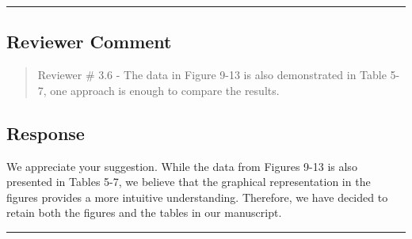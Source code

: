 \noindent\rule{\linewidth}{2.0pt}

\subsection{Reviewer Comment}
\begin{mdframed}
	\begin{quote}
		Reviewer \# 3.6 - The data in Figure 9-13 is also demonstrated in Table 5-7, one approach is enough to compare the results.
	\end{quote}
\end{mdframed}

\subsection{Response}

We appreciate your suggestion. While the data from Figures 9-13 is also presented in Tables 5-7, we believe that the graphical representation in the figures provides a more intuitive understanding. Therefore, we have decided to retain both the figures and the tables in our manuscript.

\noindent\rule{\linewidth}{6.0pt}